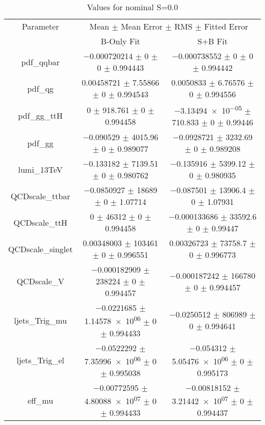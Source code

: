 \begin{table}
\centering
\caption{Values for nominal S=0.0}
\begin{tabular}{ccc}
\toprule
Parameter & \multicolumn{2}{c}{Mean $\pm$ Mean Error $\pm$ RMS $\pm$ Fitted Error}\\
 & B-Only Fit & S+B Fit\\
\midrule
pdf\_qqbar & \num{-0.000720214} $\pm$ \num{0} $\pm$ \num{0} $\pm$ \num{0.994443} & \num{-0.000738552} $\pm$ \num{0} $\pm$ \num{0} $\pm$ \num{0.994442}\\
pdf\_qg & \num{0.00458721} $\pm$ \num{7.55866} $\pm$ \num{0} $\pm$ \num{0.994543} & \num{0.0050833} $\pm$ \num{6.76576} $\pm$ \num{0} $\pm$ \num{0.994556}\\
pdf\_gg\_ttH & \num{0} $\pm$ \num{918.761} $\pm$ \num{0} $\pm$ \num{0.994458} & \num{-3.13494e-05} $\pm$ \num{710.833} $\pm$ \num{0} $\pm$ \num{0.99446}\\
pdf\_gg & \num{-0.090529} $\pm$ \num{4015.96} $\pm$ \num{0} $\pm$ \num{0.989077} & \num{-0.0928721} $\pm$ \num{3232.69} $\pm$ \num{0} $\pm$ \num{0.989208}\\
lumi\_13TeV & \num{-0.133182} $\pm$ \num{7139.51} $\pm$ \num{0} $\pm$ \num{0.980762} & \num{-0.135916} $\pm$ \num{5399.12} $\pm$ \num{0} $\pm$ \num{0.980935}\\
QCDscale\_ttbar & \num{-0.0850927} $\pm$ \num{18689} $\pm$ \num{0} $\pm$ \num{1.07714} & \num{-0.087501} $\pm$ \num{13906.4} $\pm$ \num{0} $\pm$ \num{1.07931}\\
QCDscale\_ttH & \num{0} $\pm$ \num{46312} $\pm$ \num{0} $\pm$ \num{0.994458} & \num{-0.000133686} $\pm$ \num{33592.6} $\pm$ \num{0} $\pm$ \num{0.99447}\\
QCDscale\_singlet & \num{0.00348003} $\pm$ \num{103461} $\pm$ \num{0} $\pm$ \num{0.996551} & \num{0.00326723} $\pm$ \num{73758.7} $\pm$ \num{0} $\pm$ \num{0.996773}\\
QCDscale\_V & \num{-0.000182909} $\pm$ \num{238224} $\pm$ \num{0} $\pm$ \num{0.994457} & \num{-0.000187242} $\pm$ \num{166780} $\pm$ \num{0} $\pm$ \num{0.994457}\\
ljets\_Trig\_mu & \num{-0.0221685} $\pm$ \num{1.14578e+06} $\pm$ \num{0} $\pm$ \num{0.994433} & \num{-0.0250512} $\pm$ \num{806989} $\pm$ \num{0} $\pm$ \num{0.994641}\\
ljets\_Trig\_el & \num{-0.0522292} $\pm$ \num{7.35996e+06} $\pm$ \num{0} $\pm$ \num{0.995038} & \num{-0.054312} $\pm$ \num{5.05476e+06} $\pm$ \num{0} $\pm$ \num{0.995173}\\
eff\_mu & \num{-0.00772595} $\pm$ \num{4.80088e+07} $\pm$ \num{0} $\pm$ \num{0.994433} & \num{-0.00818152} $\pm$ \num{3.21442e+07} $\pm$ \num{0} $\pm$ \num{0.994437}\\

\end{tabular}
\end{table}
